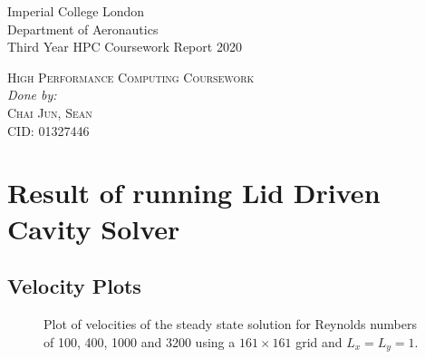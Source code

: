 \documentclass[11pt]{article}
\begin{document}
	\begin{titlepage}
	\begin{flushleft}
	Imperial College London \\
	Department of Aeronautics \\
	Third Year HPC Coursework Report 2020 \\
	\end{flushleft}
	\vspace*{\fill}	
	\begin{center}
		\textsc{\Huge High Performance Computing Coursework} \\
		\vspace{11pt}
		\textit{\small Done by:} \\
		\textsc{\Large Chai Jun, Sean} \\
		\textsc{CID: 01327446} \\ 
		\vspace*{\fill}
	\end{center}
		
	\end{titlepage}
	
	\section{Result of running Lid Driven Cavity Solver}
	\subsection{Velocity Plots}
	\begin{figure}[htp]
            \centering
            \hfill
            \caption{Plot of velocities of the steady state solution for Reynolds numbers of 100, 400, 1000 and 3200 using a $161 \times 161$ grid and $L_x = L_y = 1$.}
            \label{fig:velocities}
        \end{figure}
	
\end{document}
